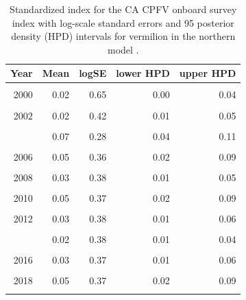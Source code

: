 \documentclass[
  english,
  a4paper,
]{article}
\begin{document}
\begin{table}

\caption{\label{tab:tab-index-cpfvonboard}Standardized index for the CA CPFV onboard survey index with log-scale standard errors and 95%
       posterior density (HPD) intervals for vermilion in the northern model .}
\centering
\begin{tabular}[t]{rrrrr}
\toprule
Year & Mean & logSE & lower HPD & upper HPD\\
\midrule
\cellcolor{gray!6}{1999} & \cellcolor{gray!6}{0.02} & \cellcolor{gray!6}{0.53} & \cellcolor{gray!6}{0.01} & \cellcolor{gray!6}{0.05}\\
2000 & 0.02 & 0.65 & 0.00 & 0.04\\
\cellcolor{gray!6}{2001} & \cellcolor{gray!6}{0.01} & \cellcolor{gray!6}{0.53} & \cellcolor{gray!6}{0.00} & \cellcolor{gray!6}{0.02}\\
2002 & 0.02 & 0.42 & 0.01 & 0.05\\
\cellcolor{gray!6}{2003} & \cellcolor{gray!6}{0.05} & \cellcolor{gray!6}{0.33} & \cellcolor{gray!6}{0.02} & \cellcolor{gray!6}{0.09}\\
\addlinespace
2004 & 0.07 & 0.28 & 0.04 & 0.11\\
\cellcolor{gray!6}{2005} & \cellcolor{gray!6}{0.04} & \cellcolor{gray!6}{0.38} & \cellcolor{gray!6}{0.02} & \cellcolor{gray!6}{0.08}\\
2006 & 0.05 & 0.36 & 0.02 & 0.09\\
\cellcolor{gray!6}{2007} & \cellcolor{gray!6}{0.06} & \cellcolor{gray!6}{0.35} & \cellcolor{gray!6}{0.03} & \cellcolor{gray!6}{0.11}\\
2008 & 0.03 & 0.38 & 0.01 & 0.05\\
\addlinespace
\cellcolor{gray!6}{2009} & \cellcolor{gray!6}{0.04} & \cellcolor{gray!6}{0.37} & \cellcolor{gray!6}{0.02} & \cellcolor{gray!6}{0.07}\\
2010 & 0.05 & 0.37 & 0.02 & 0.09\\
\cellcolor{gray!6}{2011} & \cellcolor{gray!6}{0.04} & \cellcolor{gray!6}{0.37} & \cellcolor{gray!6}{0.02} & \cellcolor{gray!6}{0.08}\\
2012 & 0.03 & 0.38 & 0.01 & 0.06\\
\cellcolor{gray!6}{2013} & \cellcolor{gray!6}{0.02} & \cellcolor{gray!6}{0.42} & \cellcolor{gray!6}{0.01} & \cellcolor{gray!6}{0.04}\\
\addlinespace
2014 & 0.02 & 0.38 & 0.01 & 0.04\\
\cellcolor{gray!6}{2015} & \cellcolor{gray!6}{0.04} & \cellcolor{gray!6}{0.37} & \cellcolor{gray!6}{0.02} & \cellcolor{gray!6}{0.07}\\
2016 & 0.03 & 0.37 & 0.01 & 0.06\\
\cellcolor{gray!6}{2017} & \cellcolor{gray!6}{0.04} & \cellcolor{gray!6}{0.36} & \cellcolor{gray!6}{0.02} & \cellcolor{gray!6}{0.08}\\
2018 & 0.05 & 0.37 & 0.02 & 0.09\\
\addlinespace
\cellcolor{gray!6}{2019} & \cellcolor{gray!6}{0.04} & \cellcolor{gray!6}{0.37} & \cellcolor{gray!6}{0.02} & \cellcolor{gray!6}{0.08}\\
\bottomrule
\end{tabular}
\end{table}
\end{document}
